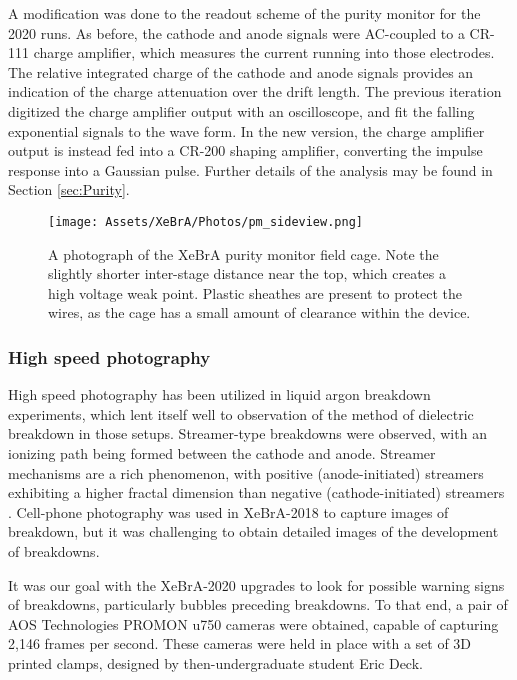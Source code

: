 A modification was done to the readout scheme of the purity monitor for the 2020 runs.
As before, the cathode and anode signals were AC-coupled to a CR-111 charge amplifier, which measures the current running into those electrodes.
The relative integrated charge of the cathode and anode signals provides an indication of the charge attenuation over the drift length.
The previous iteration digitized the charge amplifier output with an oscilloscope, and fit the falling exponential signals to the wave form.
In the new version, the charge amplifier output is instead fed into a CR-200 shaping amplifier, converting the impulse response into a Gaussian pulse.
Further details of the analysis may be found in Section \ref{sec:Purity}.


\begin{figure}
    \centering
    \texttt{[image: Assets/XeBrA/Photos/pm\_sideview.png]}
    \caption[A photograph of the XeBrA purity monitor field cage.]%
    {A photograph of the XeBrA purity monitor field cage.
    Note the slightly shorter inter-stage distance near the top, which creates a high voltage weak point.
    Plastic sheathes are present to protect the wires, as the cage has a small amount of clearance within the device.}
    \label{fig:purity_monitor}
\end{figure}

\subsubsection{High speed photography}

High speed photography has been utilized in liquid argon breakdown experiments\cite{auger_method_2014}, which lent itself well to observation of the method of dielectric breakdown in those setups.
Streamer-type breakdowns were observed, with an ionizing path being formed between the cathode and anode.
Streamer mechanisms are a rich phenomenon, with positive (anode-initiated) streamers exhibiting a higher fractal dimension than negative (cathode-initiated) streamers \cite{sun_formation_2016}.
Cell-phone photography was used in XeBrA-2018 to capture images of breakdown, but it was challenging to obtain detailed images of the development of breakdowns.

It was our goal with the XeBrA-2020 upgrades to look for possible warning signs of breakdowns, particularly bubbles preceding breakdowns.
To that end, a pair of AOS Technologies PROMON u750 cameras were obtained, capable of capturing 2,146 frames per second.
These cameras were held in place with a set of 3D printed clamps, designed by then-undergraduate student Eric Deck.

